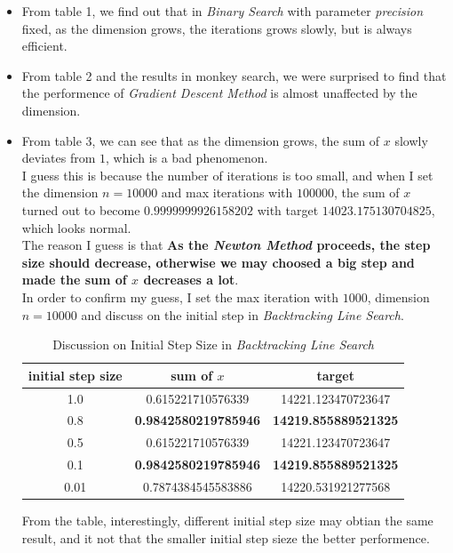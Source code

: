 \documentclass[12pt, a4paper, oneside]{article}
\begin{document}
\begin{itemize}
    \item From table 1, we find out that in \textit{Binary Search} with parameter \textit{precision} fixed, as the dimension grows, the iterations grows slowly, but is always efficient.
    \item From table 2 and the results in monkey search, we were surprised to find that the performence of \textit{Gradient Descent Method} is almost unaffected by the dimension.
    \item 
    {
        From table 3, we can see that as the dimension grows, the sum of $x$ slowly deviates from $1$, which is a bad phenomenon.\\
        I guess this is because the number of iterations is too small, and when I set the dimension $n = 10000$ and max iterations with $100000$, the sum of $x$ turned out to become $0.9999999926158202$ with target $14023.175130704825$, which looks normal.\\ 
        The reason I guess is that \textbf{As the \textit{Newton Method} proceeds, the step size should decrease, otherwise we may choosed a big step and made the sum of $x$ decreases a lot}.\\
        In order to confirm my guess, I set the max iteration with $1000$, dimension $n = 10000$ and discuss on the initial step in \textit{Backtracking Line Search}.
        \begin{table}[H]
            \begin{center}
              \caption{Discussion on Initial Step Size in \textit{Backtracking Line Search}}
              \begin{tabular}{c|c|c} %
                \textbf{initial step size} & \textbf{sum of $x$} & \textbf{target}\\
                \hline
                1.0 & 0.615221710576339 & 14221.123470723647 \\
                0.8 & \textbf{0.9842580219785946} & \textbf{14219.855889521325} \\
                0.5 & 0.615221710576339 & 14221.123470723647 \\
                0.1 & \textbf{0.9842580219785946} & \textbf{14219.855889521325} \\
                0.01 & 0.7874384545583886 & 14220.531921277568                 
              \end{tabular}
            \end{center}
        \end{table}
        From the table, interestingly, different initial step size may obtian the same result, and it not that the smaller initial step sieze the better performence. 
    }
\end{itemize}
\end{document}
